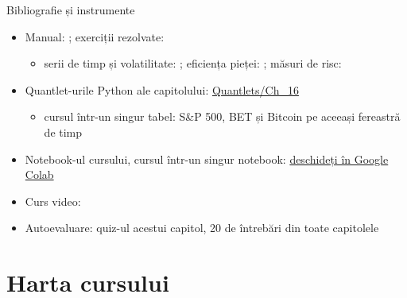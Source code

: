 \begin{frame}{Bibliografie și instrumente}
\itemsize{\small}
\begin{itemize}
    \item Manual: ; exerciții rezolvate: 
    \begin{itemize}
        \item serii de timp și volatilitate: ; eficiența pieței: ; măsuri de risc: 
    \end{itemize}
    \item Quantlet-urile Python ale capitolului: \href{https://github.com/danpele/SFM/tree/main/Quantlets/Ch_16}{Quantlets/Ch\_16}
    \begin{itemize}
        \item cursul într-un singur tabel: S\&P 500, BET și Bitcoin pe aceeași fereastră de timp
    \end{itemize}
    \item Notebook-ul cursului, cursul într-un singur notebook: \href{\colaburl{notebooks/EN/chapter16_lecture_notebook.ipynb}}{deschideți în Google Colab}
    \item Curs video: 
    \item Autoevaluare: quiz-ul acestui capitol, 20 de întrebări din toate capitolele
\end{itemize}
\end{frame}


\section{Harta cursului}

